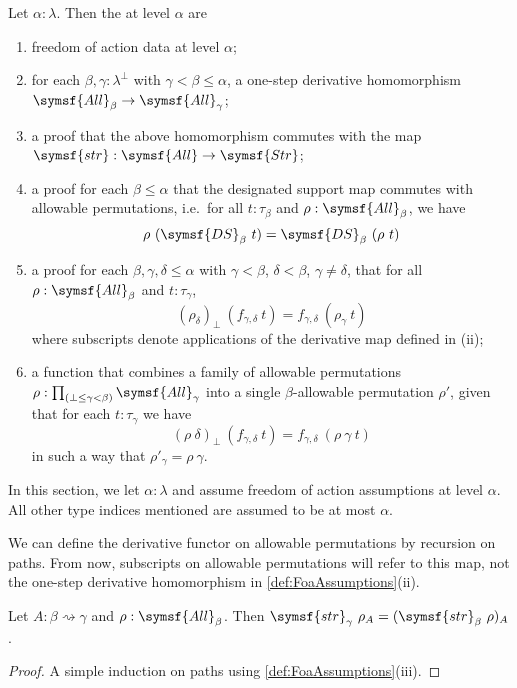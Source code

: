 \begin{definition}
    \label{def:FoaAssumptions}
    Let \( \alpha : \lambda \).
    Then the  at level \( \alpha \) are
    \begin{enumerate}
        \item freedom of action data at level \( \alpha \);
        \item for each \( \beta, \gamma : \lambda^\bot \) with \( \gamma < \beta \leq \alpha \), a one-step derivative homomorphism \( \symsf{All}_\beta \to \symsf{All}_\gamma \);
        \item a proof that the above homomorphism commutes with the map \( \symsf{str} : \symsf{All} \to \symsf{Str} \);
        \item a proof for each \( \beta \leq \alpha \) that the designated support map commutes with allowable permutations, i.e.\ for all \( t : \tau_\beta \) and \( \rho : \symsf{All}_\beta \), we have
        \[ \rho\ (\symsf{DS}_\beta\ t) = \symsf{DS}_\beta\ (\rho\ t) \]
        \item a proof for each \( \beta, \gamma, \delta \leq \alpha \) with \( \gamma < \beta \), \( \delta < \beta \), \( \gamma \neq \delta \), that for all \( \rho : \symsf{All}_\beta \) and \( t : \tau_\gamma \),
        \[ (\rho_\delta)_\bot\ (f_{\gamma,\delta}\ t) = f_{\gamma,\delta}\ (\rho_\gamma\ t) \]
        where subscripts denote applications of the derivative map defined in (ii);
        \item a function that combines a family of allowable permutations \( \rho : \prod_{(\bot \leq \gamma < \beta)} \symsf{All}_\gamma \) into a single \( \beta \)-allowable permutation \( \rho' \), given that for each \( t : \tau_\gamma \) we have
        \[ (\rho\ \delta)_\bot\ (f_{\gamma,\delta}\ t) = f_{\gamma,\delta}\ (\rho\ \gamma\ t) \]
        in such a way that \( \rho'_\gamma = \rho\ \gamma \).
    \end{enumerate}
\end{definition}
In this section, we let \( \alpha : \lambda \) and assume freedom of action assumptions at level \( \alpha \).
All other type indices mentioned are assumed to be at most \( \alpha \).
\begin{definition}
    We can define the derivative functor on allowable permutations by recursion on paths.
    From now, subscripts on allowable permutations will refer to this map, not the one-step derivative homomorphism in \cref{def:FoaAssumptions}(ii).
\end{definition}
\begin{lemma}
    \label{lem:toStructPerm_comp}
    Let \( A : \beta \rightsquigarrow \gamma \) and \( \rho : \symsf{All}_\beta \).
    Then \( \symsf{str}_\gamma\ \rho_A = (\symsf{str}_\beta\ \rho)_A \).
\end{lemma}
\begin{proof}
    A simple induction on paths using \cref{def:FoaAssumptions}(iii).
\end{proof}
